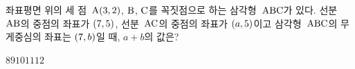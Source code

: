 좌표평면 위의 세 점~$\mathrm{A}(3{,}\mkern3mu 2)$, $\mathrm{B}$, $\mathrm{C}$를 꼭짓점으로 하는 삼각형~$\mathrm{ABC}$가 있다. 선분~$\mathrm{AB}$의 중점의 좌표가 $(7{,}\mkern3mu 5)$, 선분~$\mathrm{AC}$의 중점의 좌표가 $(a{,}\mkern3mu 5)$이고 삼각형~$\mathrm{ABC}$의 무게중심의 좌표는 $(7{,}\mkern3mu b)$일 때, $a+b$의 값은?
\begin{choices32}{$8$}{$9$}{$10$}{$11$}{$12$}\end{choices32}
